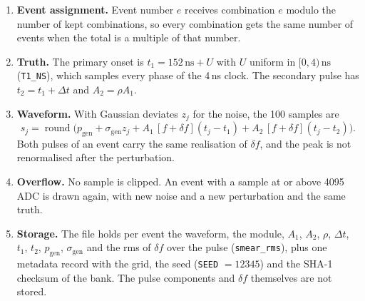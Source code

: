 \documentclass[11pt]{article}
\newcommand{\ns}{\,\mathrm{ns}}
\newcommand{\code}[1]{\texttt{#1}}
\begin{document}
\begin{enumerate}
\item \textbf{Event assignment.} Event number $e$ receives combination $e$ modulo the number of kept combinations, so every combination gets the same number of events when the total is a multiple of that number.
\item \textbf{Truth.} The primary onset is $t_1 = 152\ns + U$ with $U$ uniform in $[0, 4)\ns$ (\code{T1\_NS}), which samples every phase of the 4\,ns clock. The secondary pulse has $t_2 = t_1 + \Delta t$ and $A_2 = \rho A_1$.
\item \textbf{Waveform.} With Gaussian deviates $z_j$ for the noise, the 100 samples are
\begin{equation}
s_j = \operatorname{round}\Big( p_{\mathrm{gen}} + \sigma_{\mathrm{gen}} z_j + A_1\, [f + \delta f](t_j - t_1) + A_2\, [f + \delta f](t_j - t_2) \Big) .
\label{eq:genwave}
\end{equation}
Both pulses of an event carry the same realisation of $\delta f$, and the peak is not renormalised after the perturbation.
\item \textbf{Overflow.} No sample is clipped. An event with a sample at or above 4095\,ADC is drawn again, with new noise and a new perturbation and the same truth.
\item \textbf{Storage.} The file holds per event the waveform, the module, $A_1$, $A_2$, $\rho$, $\Delta t$, $t_1$, $t_2$, $p_{\mathrm{gen}}$, $\sigma_{\mathrm{gen}}$ and the rms of $\delta f$ over the pulse (\code{smear\_rms}), plus one metadata record with the grid, the seed (\code{SEED} $= 12345$) and the SHA-1 checksum of the bank. The pulse components and $\delta f$ themselves are not stored.
\end{enumerate}
\end{document}
